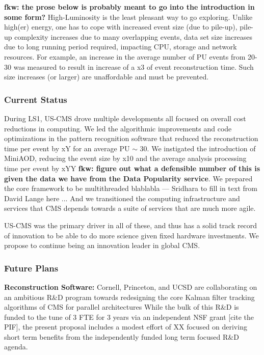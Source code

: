 \documentclass[11pt,a4paper]{article}
\begin{document}
{\bf fkw: the prose below is probably meant to go into the introduction in some form?} 
High-Luminosity is the least
pleasant way to go exploring. Unlike high(er) energy, one has to cope
with increased event size (due to pile-up), pile-up complexity
increases due to many overlapping events, data set size increases due
to long running period required, impacting CPU, storage and network
resources.  For example, an increase in the average number of PU events from 20-30
was measured to result in increase of a x3 of event reconstruction
time. Such size increases (or larger) are unaffordable and must be
prevented.

\subsubsection{Current Status}

During LS1, US-CMS drove multiple developments all focused on overall cost reductions in computing.
We led the algorithmic improvements and code optimizations in the pattern recognition software that reduced the reconstruction
time per event by xY for an average PU $\sim$ 30. We instigated the introduction of MiniAOD, reducing the event size by x10
and the average analysis processing time per event by xYY {\bf fkw: figure out what a defensible number of this is given the data we have
from the Data Popularity service}. 
We prepared the core framework to be multithreaded blablabla --- Sridhara to fill in text from David Lange here ... 
And we transitioned the computing infrastructure and services that CMS depends towards a suite of services that are much more agile.

US-CMS was the primary driver in all of these, and thus has a solid track record of innovation to be able to do more science
given fixed hardware investments. We propose to continue being an innovation leader in global CMS. 

\subsubsection{Future Plans}

{\bf Reconstruction Software:}
Cornell, Princeton, and UCSD are collaborating on an ambitious R\&D program towards redesigning the core Kalman filter tracking algorithms of CMS for parallel architectures While the bulk of this R\&D is funded to the tune of 3 FTE for 3 years
via an independent NSF grant [cite the PIF], the present proposal includes a modest effort of XX focused on deriving short term
benefits from the independently funded long term focused R\&D agenda.
\end{document}
